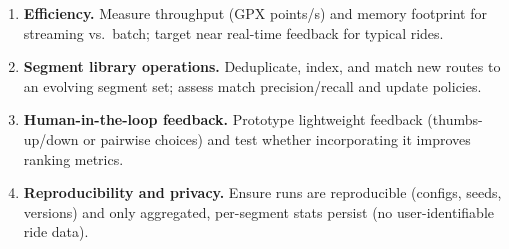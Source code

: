 \documentclass[11pt,twoside]{report}
\begin{document}
\begin{enumerate}[label=O\arabic*., leftmargin=2.2em]
	\item \textbf{Efficiency.} Measure throughput (GPX points/s) and memory footprint for streaming vs.\ batch; target near real-time feedback for typical rides.
	\item \textbf{Segment library operations.} Deduplicate, index, and match new routes to an evolving segment set; assess match precision/recall and update policies.
	\item \textbf{Human-in-the-loop feedback.} Prototype lightweight feedback (thumbs-up/down or pairwise choices) and test whether incorporating it improves ranking metrics.
	\item \textbf{Reproducibility and privacy.} Ensure runs are reproducible (configs, seeds, versions) and only aggregated, per-segment stats persist (no user-identifiable ride data).
\end{enumerate}
\end{document}
